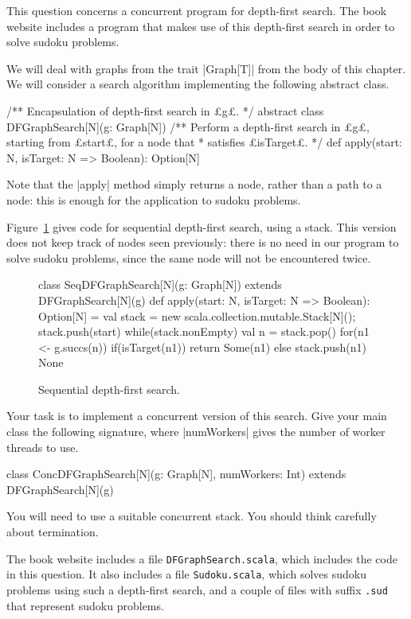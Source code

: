 \begin{question}
\label{ex:dfs} 
This question concerns a concurrent program for depth-first search.  The book
website includes a program that makes use of this depth-first search in order
to solve sudoku problems.

We will deal with graphs from the trait |Graph[T]| from the body of this
chapter.  We will consider a search algorithm implementing the following
abstract class.
%
\begin{scala}
/** Encapsulation of depth-first search in £g£. */
abstract class DFGraphSearch[N](g: Graph[N]){
  /** Perform a depth-first search in £g£, starting from £start£, for a node that
    * satisfies £isTarget£.  */
  def apply(start: N, isTarget: N => Boolean): Option[N] 
}
\end{scala}
%
Note that the |apply| method simply returns a node, rather than a path to a
node: this is enough for the application to sudoku problems.

Figure~\ref{fig:dfs-seq} gives code for sequential depth-first search, using a
stack.  This
version does not keep track of nodes seen previously: there is no need in our
program to solve sudoku problems, since the same node will not be encountered
twice. 


\begin{figure}
\begin{scala}
class SeqDFGraphSearch[N](g: Graph[N]) extends DFGraphSearch[N](g){
  def apply(start: N, isTarget: N => Boolean): Option[N] = {
    val stack = new scala.collection.mutable.Stack[N](); stack.push(start)
    while(stack.nonEmpty){
      val n = stack.pop()
      for(n1 <- g.succs(n)){
        if(isTarget(n1)) return Some(n1) else stack.push(n1)
      }
    }
    None
  }
}
\end{scala}
\caption{Sequential depth-first search.}
\label{fig:dfs-seq}
\end{figure}


Your task is to implement a concurrent version of this search.  Give your main
class the following signature, where |numWorkers| gives the number of worker
threads to use.
%
\begin{scala}
class ConcDFGraphSearch[N](g: Graph[N], numWorkers: Int)
    extends DFGraphSearch[N](g)
\end{scala}
%
You will need to use a suitable concurrent stack.  You should think carefully
about termination.

The book website includes a file \texttt{DFGraphSearch.scala}, which includes
the code in this question.  It also includes a file \texttt{Sudoku.scala},
which solves sudoku problems using such a depth-first search, and a couple of
files with suffix \texttt{.sud} that represent sudoku problems.
\end{question}

